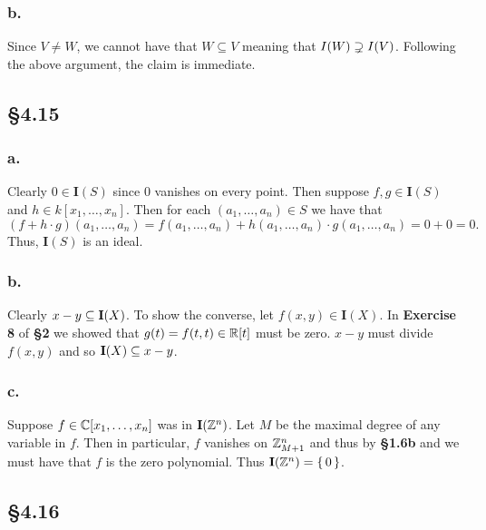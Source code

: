 \documentclass[letterpaper]{article}
\begin{document}
\subsubsection*{b.}

Since $V \neq W$, we cannot have that $W \subseteq V$ meaning that $I(W) \supsetneq I(V)$.
Following the above argument, the claim is immediate.

\subsection*{\S 4.15}

\subsubsection*{a.}

Clearly $0 \in \mathbf{I}(S)$ since $0$ vanishes on every point.
Then suppose $f, g \in \mathbf{I}(S)$ and $h \in k[x_{1},\ldots, x_{n}]$.
Then for each $(a_{1}, \ldots, a_{n}) \in S$ we have that
\[
  (f + h \cdot g)(a_{1}, \ldots, a_{n}) = f(a_{1}, \ldots, a_{n}) + h(a_{1}, \ldots, a_{n}) \cdot g(a_{1}, \ldots, a_{n}) = 0 + 0 = 0.
\]
Thus, $\mathbf{I}(S)$ is an ideal.

\subsubsection*{b.}

Clearly $\ideal{x - y} \subseteq \mathbf{I}(X)$.
To show the converse, let $f(x, y) \in \mathbf{I}(X)$.
In \textbf{Exercise 8} of \textbf{\S 2} we showed that $g(t) = f(t, t) \in \mathbb{R}[t]$ must be zero.
 $x - y$ must divide $f(x, y)$ and so $\mathbf{I}(X) \subseteq \ideal{x - y}$.

\subsubsection*{c.}

Suppose $f \in \mathbb{C}[x_{1}, \ldots, x_{n}]$ was in $\mathbf{I}\pqty{\Z^{n}}$.
Let $M$ be the maximal degree of any variable in $f$.
Then in particular, $f$ vanishes on $\mathbb{Z}_{M + 1}^{n}$ and thus by \textbf{\S 1.6b} and we must have that $f$ is the zero polynomial.
Thus $\mathbf{I}\pqty{\Z^{n}} = \set{0}$.

\subsection*{\S 4.16}
\end{document}
